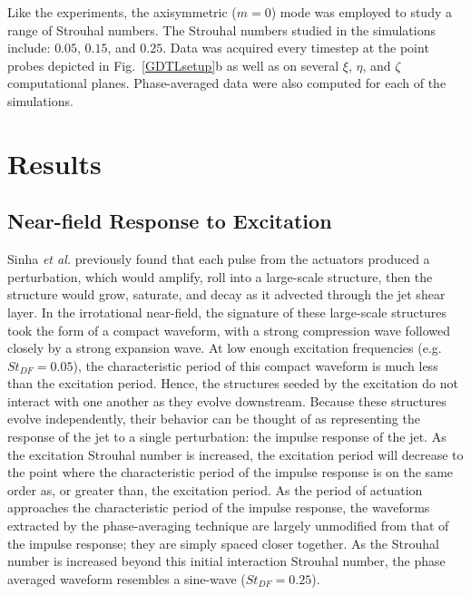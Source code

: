 \documentclass[english]{aiaa-tc}
\begin{document}
Like the experiments, the axisymmetric ($m=0$) mode was employed to
study a range of Strouhal numbers. The Strouhal numbers studied in the
simulations include: $0.05$, $0.15$, and $0.25$. Data was acquired
every timestep at the point probes depicted in Fig.~\ref{GDTLsetup}b
as well as on several $\xi$, $\eta$, and $\zeta$ computational planes.
Phase-averaged data were also computed for each of the simulations.



\section{Results}\label{results}

\subsection{Near-field Response to Excitation}
Sinha {\em et al.} \cite{sinha2013} previously found that each pulse
from the actuators produced a perturbation, which would amplify, roll
into a large-scale structure, then the structure would grow, saturate,
and decay as it advected through the jet shear layer. In the
irrotational near-field, the signature of these large-scale structures
took the form of a compact waveform, with a strong compression wave
followed closely by a strong expansion wave. At low enough excitation
frequencies (e.g. $St_{DF} = 0.05$), the characteristic period of this
compact waveform is much less than the excitation period. Hence, the
structures seeded by the excitation do not interact with one another
as they evolve downstream. Because these structures evolve
independently, their behavior can be thought of as representing the
response of the jet to a single perturbation: the impulse response of
the jet. As the excitation Strouhal number is increased, the
excitation period will decrease to the point where the characteristic
period of the impulse response is on the same order as, or greater
than, the excitation period. As the period of actuation approaches the
characteristic period of the impulse response, the waveforms extracted
by the phase-averaging technique are largely unmodified from that of
the impulse response; they are simply spaced closer together. As the
Strouhal number is increased beyond this initial interaction Strouhal
number, the phase averaged waveform resembles a sine-wave
($St_{DF}=0.25$).  
\end{document}
